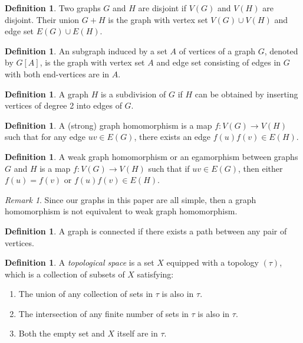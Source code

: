 \documentclass{amsart}
\theoremstyle{definition}
\newtheorem{definition}[theorem]{Definition}
\theoremstyle{remark}
\newtheorem{remark}[theorem]{Remark}
\numberwithin{equation}{section}
\begin{document}
	\begin{definition} \cite{ChartrandZhang}
		Two graphs \(G\) and \(H\) are disjoint if \(V(G)\) and \(V(H)\) are disjoint. Their union \(G + H\)
		is the graph with vertex set \(V(G) \cup V(H)\) and edge set \(E(G) \cup E(H)\).
	\end{definition}
	
	\begin{definition} \cite{ChartrandZhang}
		An subgraph induced by a set \(A\) of vertices of a graph \(G\), denoted by \(G[A]\), is the graph with vertex set \(A\) and edge set consisting of edges in \(G\) with both end-vertices are in \(A\).
	\end{definition}
	
	\begin{definition} \cite{ChartrandZhang}
		A graph \(H\) is a subdivision of \(G\) if \(H\) can be obtained by inserting vertices of
		degree 2 into edges of \(G\).
	\end{definition}
	
	\begin{definition}\cite{Knauer2019algebraic}
		A (strong) graph homomorphism is a map \(f: V(G) \rightarrow V(H)\) such that for
		any edge \( uv \in E(G) \), there exists an edge \( f(u)f(v) \in E(H) \).
	\end{definition}
	
	\begin{definition}\cite{Knauer2019algebraic}
		A weak graph homomorphism or an egamorphism between graphs \( G \) and \( H \) is a map \(f: V(G) \rightarrow V(H)\) such that if \( u v \in E(G) \), then either \(f(u) = f(v)\) or \( f(u)f(v) \in E(H) \).
	\end{definition}
	
	\begin{remark}
		Since our graphs in this paper are all simple, then a graph homomorphism is not equivalent to weak graph homomorphism. \cite{Knauer2019algebraic}
	\end{remark}
	
	\begin{definition}\cite{ChartrandZhang}
		A graph is connected if there exists a path between any pair of vertices.
	\end{definition}
	
	\begin{definition}\cite{Munkres}
		A \textit{topological space} is a set \( X \) equipped with a topology \(
		(\tau) \), which is a collection of subsets of \( X \) satisfying:
		\begin{enumerate}
			\item The union of any collection of sets in \( \tau \) is also
			in \( \tau \).
			\item The intersection of any finite number of sets in \( \tau \)
			is also in \( \tau \).
			\item Both the empty set and \( X \) itself are in \( \tau \).
		\end{enumerate}
	\end{definition}
	
\end{document}
